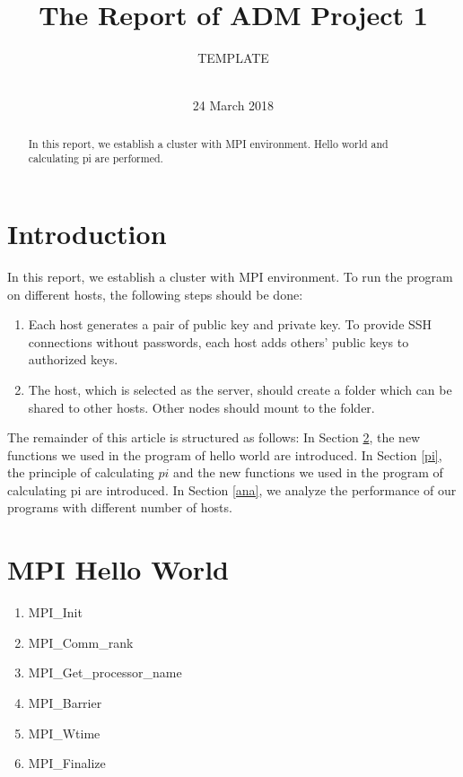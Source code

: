 \documentclass{sig-alternate-05-2015}
\begin{document}
\title{The Report of ADM Project 1} 
\author{ 
\alignauthor
       TEMPLATE\\
       \\
 } 
\date{24 March 2018}
 
\maketitle

\begin{abstract}
In this report, we establish a cluster with MPI environment.
Hello world and calculating pi are performed.

\end{abstract}
\section{Introduction} 
In this report, we establish a cluster with MPI environment.
 To run the program on different hosts, the following steps should be done:
 \begin{enumerate}
 \item Each host generates a pair of public key and private key. To provide SSH connections without passwords, each host adds others' public keys to authorized keys.
 \item The host, which is selected as the server, should create a folder which can be shared to other hosts. Other nodes should mount to the folder.
 \end{enumerate}
The remainder of this article is structured as follows: 
In Section \ref{hello}, the new functions we used in the program of hello world are introduced. 
In Section \ref{pi}, the principle of calculating $pi$  and the new functions we used in the program of calculating pi are introduced.
In Section \ref{ana}, we analyze the performance of our programs with different number of hosts.
\section{MPI Hello World}\label{hello}
\begin{enumerate}
 \item MPI\_Init
 \item MPI\_Comm\_rank
 \item MPI\_Get\_processor\_name
 \item MPI\_Barrier
 \item MPI\_Wtime
 \item MPI\_Finalize
\end{enumerate}
 
\end{document}
